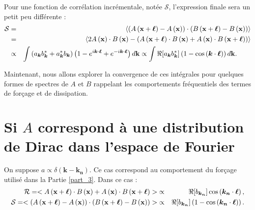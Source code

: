 Pour une fonction de corrélation incrémentale, notée $\mathcal{S}$, l'expression finale sera un petit peu différente :
\begin{eqnarray}
\mathcal{S} &=& \left<\left(A\left({\bf x} + \boldsymbol{\ell}\right) - A\left({\bf x}\right)\right)\cdot\left(B\left({\bf x} + \boldsymbol{\ell}\right) - B\left({\bf x}\right)\right) \right> \\
&=& \left<2A\left({\bf x}\right)\cdot B\left({\bf x}\right) -  \left(A\left({\bf x} + \boldsymbol{\ell}\right)  \cdot B\left({\bf x}\right) + A\left({\bf x}\right)  \cdot B\left({\bf x} + \boldsymbol{\ell}\right)\right) \right>\\
&\propto& \int \left(a_{\boldsymbol{k}}  b^*_{\boldsymbol{k}} + a^*_{\boldsymbol{k}}  b_{\boldsymbol{k}}\right) \left(1 - e^{i\boldsymbol{k}\cdot\boldsymbol{\ell}} + e^{-i\boldsymbol{k}\cdot\boldsymbol{\ell}}\right)  d{\bf k} \propto \int \Re[a_{\boldsymbol{k}}  b^*_{\boldsymbol{k}}] \left(1-\cos\left(\boldsymbol{k}\cdot\boldsymbol{\ell}\right)\right) d{\bf k} .\qquad
\end{eqnarray}

Maintenant, nous allons explorer la convergence de ces intégrales pour quelques formes de spectres de $A$ et $B$ rappelant les comportements fréquentiels des termes de forçage et de dissipation.  

\section{Si $A$ correspond à une distribution de Dirac dans l'espace de Fourier} \label{an:forc} 

On suppose $a \propto \delta\left(\boldsymbol{k} - \boldsymbol{k_n}\right)$. Ce cas correspond au comportement du forçage utilisé dans la Partie \ref{part_3}. Dans ce cas :
\begin{eqnarray}
\mathcal{R} = <A\left({\bf x} + \boldsymbol{\ell}\right)  \cdot B\left({\bf x}\right) + A\left({\bf x}\right)  \cdot B\left({\bf x} + \boldsymbol{\ell}\right)> 
&\propto& \Re[b_{\boldsymbol{k_n}}] \cos\left(\boldsymbol{k_n}\cdot\boldsymbol{\ell}\right), \\
\mathcal{S} = <\left(A\left({\bf x} + \boldsymbol{\ell}\right) - A\left({\bf x}\right)\right)\cdot\left(B\left({\bf x} + \boldsymbol{\ell}\right) - B\left({\bf x}\right)\right) > 
&\propto&\Re[b_{\boldsymbol{k_n}}] \left(1-\cos\left(\boldsymbol{k_n}\cdot\boldsymbol{\ell}\right)\right) .\nonumber \\
\end{eqnarray}

